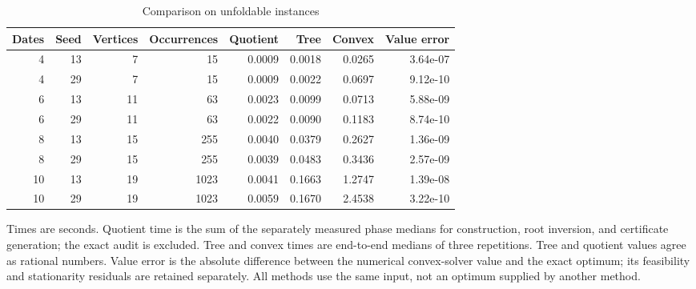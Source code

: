 \begin{table}[htbp]
\centering\small
\caption{Comparison on unfoldable instances}\label{tab:comparison}
\begin{tabular}{rrrrrrrr}
\toprule
Dates & Seed & Vertices & Occurrences & Quotient & Tree & Convex & Value error \\
\midrule
4 & 13 & 7 & 15 & 0.0009 & 0.0018 & 0.0265 & 3.64e-07 \\
4 & 29 & 7 & 15 & 0.0009 & 0.0022 & 0.0697 & 9.12e-10 \\
6 & 13 & 11 & 63 & 0.0023 & 0.0099 & 0.0713 & 5.88e-09 \\
6 & 29 & 11 & 63 & 0.0022 & 0.0090 & 0.1183 & 8.74e-10 \\
8 & 13 & 15 & 255 & 0.0040 & 0.0379 & 0.2627 & 1.36e-09 \\
8 & 29 & 15 & 255 & 0.0039 & 0.0483 & 0.3436 & 2.57e-09 \\
10 & 13 & 19 & 1023 & 0.0041 & 0.1663 & 1.2747 & 1.39e-08 \\
10 & 29 & 19 & 1023 & 0.0059 & 0.1670 & 2.4538 & 3.22e-10 \\
\bottomrule
\end{tabular}
\par\smallskip\begin{minipage}{\textwidth}\footnotesize Times are seconds. Quotient time is the sum of the separately measured phase medians for construction, root inversion, and certificate generation; the exact audit is excluded. Tree and convex times are end-to-end medians of three repetitions. Tree and quotient values agree as rational numbers. Value error is the absolute difference between the numerical convex-solver value and the exact optimum; its feasibility and stationarity residuals are retained separately. All methods use the same input, not an optimum supplied by another method.\end{minipage}
\end{table}
\clearpage
